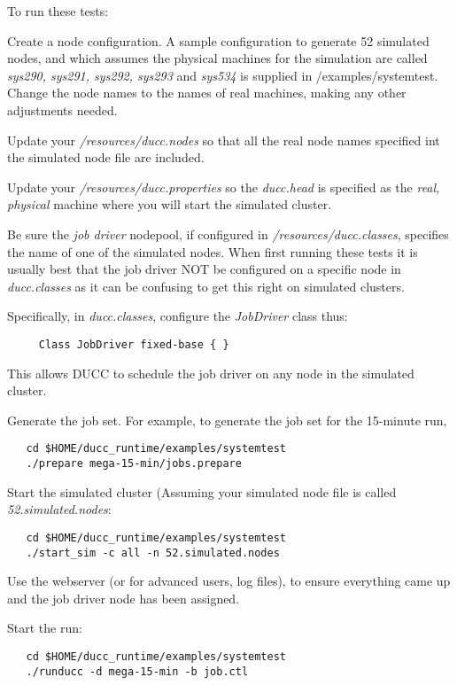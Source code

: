     To run these tests:
     \begin{enumerate}

       \begin{sloppypar}
       \item Create a node configuration.  A sample configuration to generate
         52 simulated nodes, and which assumes the
         physical machines for the simulation are called {\em sys290, sys291, sys292, sys293}
         and {\em sys534} is supplied in \duccruntime/examples/systemtest. Change
         the node names to the names of real machines, making any other adjustments
         needed.
       \end{sloppypar}
       
       \item Update your {\em \duccruntime/resources/ducc.nodes} so that all the real node names specified
         int the simulated node file are included.
       \item Update your {\em \duccruntime/resources/ducc.properties} so the 
         {\em ducc.head} is specified as the {\em real, physical} machine where you will
         start the simulated cluster.
       \item Be sure the {\em job driver} nodepool, if configured in
         {\em \duccruntime/resources/ducc.classes}, specifies the name of one of the
         simulated nodes.  When first running these tests it is usually best that
         the job driver NOT be configured on a specific node in {\em ducc.classes}
         as it can be confusing to get this right on simulated clusters.

         Specifically, in {\em ducc.classes}, configure the {\em JobDriver} class
         thus:
\begin{verbatim}
     Class JobDriver fixed-base { }
\end{verbatim}
         This allows DUCC to schedule the job driver on any node in the simulated
         cluster.
        
       \item Generate the job set.  For example, to generate the job set for the
         15-minute run,
\begin{verbatim}
   cd $HOME/ducc_runtime/examples/systemtest
   ./prepare mega-15-min/jobs.prepare
\end{verbatim}
         \item Start the simulated cluster (Assuming your simulated node file is called
           {\em 52.simulated.nodes}:
\begin{verbatim}
   cd $HOME/ducc_runtime/examples/systemtest
   ./start_sim -c all -n 52.simulated.nodes
\end{verbatim}
         \item Use the webserver (or for advanced users, log files), to ensure
           everything came up and the job driver node has been assigned.
         \item Start the run:
\begin{verbatim}
   cd $HOME/ducc_runtime/examples/systemtest
   ./runducc -d mega-15-min -b job.ctl
\end{verbatim}             
         \end{enumerate}
     
